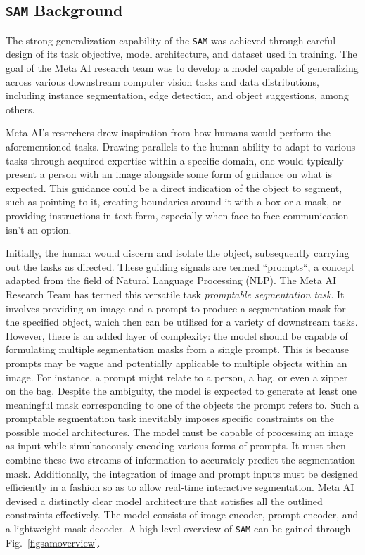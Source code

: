 \subsection{\texttt{SAM} Background}\label{SAMbg}
The strong generalization capability of the \texttt{SAM} was achieved through careful design of its task objective, model architecture, and dataset used in training. The goal of the Meta AI research team was to develop a model capable of generalizing across various downstream computer vision tasks and data distributions, including instance segmentation, edge detection, and object suggestions, among others.

Meta AI's reserchers drew inspiration from how humans would perform the aforementioned tasks. Drawing parallels to the human ability to adapt to various tasks through acquired expertise within a specific domain, one would typically present a person with an image alongside some form of guidance on what is expected. This guidance could be a direct indication of the object to segment, such as pointing to it, creating boundaries around it with a box or a mask, or providing instructions in text form, especially when face-to-face communication isn't an option.

Initially, the human would discern and isolate the object, subsequently carrying out the tasks as directed. These guiding signals are termed “prompts“, a concept adapted from the field of Natural Language Processing (NLP). The Meta AI Research Team has termed this versatile task \textit{promptable segmentation task}. It involves providing an image and a prompt to produce a segmentation mask for the specified object, which then can be utilised for a variety of downstream tasks. However, there is an added layer of complexity: the model should be capable of formulating multiple segmentation masks from a single prompt. This is because prompts may be vague and potentially applicable to multiple objects within an image. For instance, a prompt might relate to a person, a bag, or even a zipper on the bag. Despite the ambiguity, the model is expected to generate at least one meaningful mask corresponding to one of the objects the prompt refers to.
Such a promptable segmentation task inevitably imposes specific constraints on the possible model architectures. The model must be capable of processing an image as input while simultaneously encoding various forms of prompts. It must then combine these two streams of information to accurately predict the segmentation mask. Additionally, the integration of image and prompt inputs must be designed efficiently in a fashion so as to allow real-time interactive segmentation. 
Meta AI devised a distinctly clear model architecture that satisfies all the outlined constraints effectively. The model consists of image encoder, prompt encoder, and a lightweight mask decoder. A high-level overview of \texttt{SAM} can be gained through Fig.~\ref{figsamoverview}.

